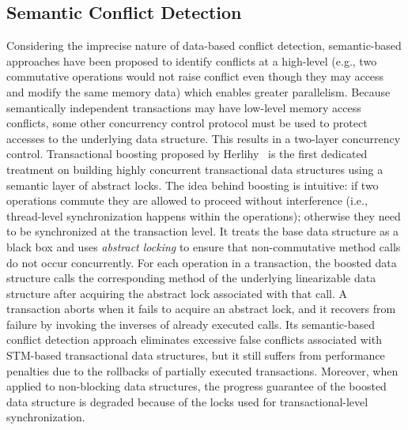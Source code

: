 \documentclass{sig-alternate-05-2015}
\begin{document}
\subsection{Semantic Conflict Detection}
Considering the imprecise nature of data-based conflict detection, semantic-based approaches have been proposed to identify conflicts at a high-level (e.g., two commutative operations would not raise conflict even though they may access and modify the same memory data) which enables greater parallelism.
Because semantically independent transactions may have low-level memory access conflicts, some other concurrency control protocol must be used to protect accesses to the underlying data structure.
This results in a two-layer concurrency control.
Transactional boosting proposed by Herlihy~\cite{herlihy2008transactional} is the first dedicated treatment on building highly concurrent transactional data structures using a semantic layer of abstract locks. 
The idea behind boosting is intuitive: if two operations commute they are allowed to proceed without interference (i.e., thread-level synchronization happens within the operations); otherwise they need to be synchronized at the transaction level.
It treats the base data structure as a black box and uses \emph{abstract locking} to ensure that non-commutative method calls do not occur concurrently. 
For each operation in a transaction, the boosted data structure calls the corresponding method of the underlying linearizable data structure after acquiring the abstract lock associated with that call. 
A transaction aborts when it fails to acquire an abstract lock, and it recovers from failure by invoking the inverses of already executed calls. 
Its semantic-based conflict detection approach eliminates excessive false conflicts associated with STM-based transactional data structures, but it still suffers from performance penalties due to the rollbacks of partially executed transactions.
Moreover, when applied to non-blocking data structures, the progress guarantee of the boosted data structure is degraded because of the locks used for transactional-level synchronization.
\end{document}
